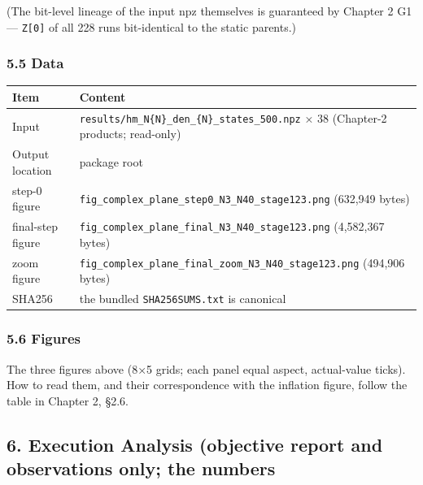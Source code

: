 \documentclass[
  a4paper,
]{ltjsarticle}
\newcounter{none} %
\begin{document}
(The bit-level lineage of the input npz themselves is guaranteed by
Chapter 2 G1 --- \texttt{Z{[}0{]}} of all 228 runs bit-identical to the
static parents.)

\subsubsection{5.5 Data}\label{data}

{\def\LTcaptype{none} %
\begin{longtable}[]{@{}
  >{\raggedright\arraybackslash}p{}
  >{\raggedright\arraybackslash}p{}@{}}
\toprule\noalign{}
\begin{minipage}[b]{\linewidth}\raggedright
Item
\end{minipage} & \begin{minipage}[b]{\linewidth}\raggedright
Content
\end{minipage} \\
\midrule\noalign{}
\endhead
\bottomrule\noalign{}
\endlastfoot
Input & \texttt{results/hm\_N\{N\}\_den\_\{N\}\_states\_500.npz} × 38
(Chapter-2 products; read-only) \\
Output location & package root \\
step-0 figure &
\texttt{fig\_complex\_plane\_step0\_N3\_N40\_stage123.png} (632,949
bytes) \\
final-step figure &
\texttt{fig\_complex\_plane\_final\_N3\_N40\_stage123.png} (4,582,367
bytes) \\
zoom figure &
\texttt{fig\_complex\_plane\_final\_zoom\_N3\_N40\_stage123.png}
(494,906 bytes) \\
SHA256 & the bundled \texttt{SHA256SUMS.txt} is canonical \\
\end{longtable}
}

\subsubsection{5.6 Figures}\label{figures}

The three figures above (8×5 grids; each panel equal aspect,
actual-value ticks). How to read them, and their correspondence with the
inflation figure, follow the table in Chapter 2, §2.6.

\subsection{6. Execution Analysis (objective report and observations
only; the
numbers}\label{execution-analysis-objective-report-and-observations-only-the-numbers}
\end{document}
